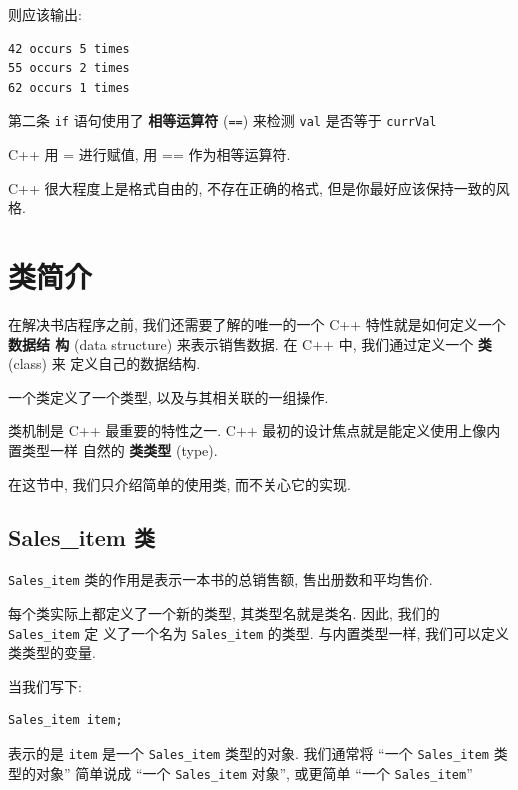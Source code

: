\documentclass[lang=cn]{elegantbook}
\begin{document}
则应该输出:

\begin{verbatim}
42 occurs 5 times
55 occurs 2 times
62 occurs 1 times
\end{verbatim}

第二条 \texttt{if} 语句使用了 \textbf{相等运算符} (\texttt{==}) 来检测 \texttt{val} 是否等于 \texttt{currVal}

\vspace*{1\baselineskip}
\begin{note}
C++ 用 = 进行赋值, 用 == 作为相等运算符.
\end{note}


\vspace*{1\baselineskip}
\begin{definition}[C++ 程序的缩进和格式]
C++ 很大程度上是格式自由的, 不存在正确的格式, 但是你最好应该保持一致的风格.
\end{definition}

\section{类简介}
\label{sec:orgc7cd8e9}

在解决书店程序之前, 我们还需要了解的唯一的一个 C++ 特性就是如何定义一个 \textbf{数据结
构} (data structure) 来表示销售数据. 在 C++ 中, 我们通过定义一个 \textbf{类} (class) 来
定义自己的数据结构.

一个类定义了一个类型, 以及与其相关联的一组操作.

类机制是 C++ 最重要的特性之一. C++ 最初的设计焦点就是能定义使用上像内置类型一样
自然的 \textbf{类类型} (type).

在这节中, 我们只介绍简单的使用类, 而不关心它的实现.

\subsection{Sales\_item 类}
\label{sec:org47a0bd8}

\texttt{Sales\_item} 类的作用是表示一本书的总销售额, 售出册数和平均售价.

每个类实际上都定义了一个新的类型, 其类型名就是类名. 因此, 我们的 \texttt{Sales\_item} 定
义了一个名为 \texttt{Sales\_item} 的类型. 与内置类型一样, 我们可以定义类类型的变量.

当我们写下:

\begin{verbatim}
Sales_item item;
\end{verbatim}

表示的是 \texttt{item} 是一个 \texttt{Sales\_item} 类型的对象. 我们通常将 ``一个 \texttt{Sales\_item} 类
型的对象'' 简单说成 ``一个 \texttt{Sales\_item} 对象'', 或更简单 ``一个 \texttt{Sales\_item}''
\end{document}
